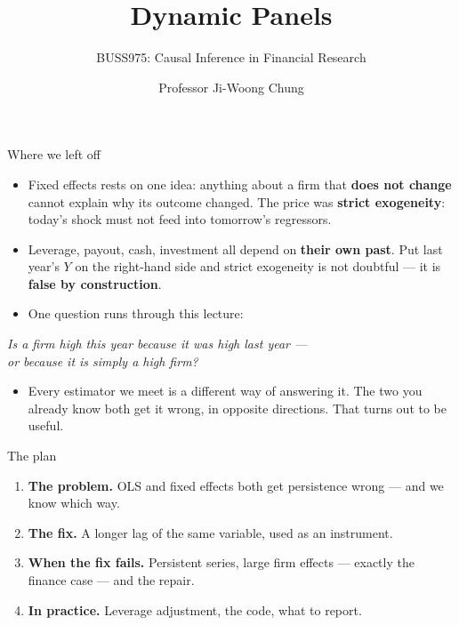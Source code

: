 \documentclass[
  11pt,
  ignorenonframetext,
  aspectratio=169,
]{beamer}
\title{\texorpdfstring{Dynamic Panels}{Dynamic Panels}}
\subtitle{\texorpdfstring{BUSS975: Causal Inference in Financial
Research}{BUSS975: Causal Inference in Financial Research}}
\author{Professor Ji-Woong Chung}
\date{}
\institute{Korea University}
\providecommand{\tightlist}{%
  \setlength{\itemsep}{0pt}\setlength{\parskip}{0pt}}
\begin{document}
\frame{\titlepage}


\begin{frame}{Where we left off}
\protect{}\label{where-we-left-off}
\begin{itemize}
\tightlist
\item
  Fixed effects rests on one idea: anything about a firm that
  \textbf{does not change} cannot explain why its outcome changed. The
  price was \textbf{strict exogeneity}: today's shock must not feed into
  tomorrow's regressors.
\item
  Leverage, payout, cash, investment all depend on \textbf{their own
  past}. Put last year's \(Y\) on the right-hand side and strict
  exogeneity is not doubtful --- it is \textbf{false by construction}.
\end{itemize}

\vspace{0.5em}

\begin{itemize}
\tightlist
\item
  One question runs through this lecture:
\end{itemize}

\begin{center}
\emph{Is a firm high this year because it was high last year ---\\ or because it is simply a high firm?}
\end{center}

\begin{itemize}
\tightlist
\item
  Every estimator we meet is a different way of answering it. The two
  you already know both get it wrong, in opposite directions. That turns
  out to be useful.
\end{itemize}
\end{frame}

\begin{frame}{The plan}
\protect{}\label{the-plan}
\begin{enumerate}
\tightlist
\item
  \textbf{The problem.} OLS and fixed effects both get persistence wrong
  --- and we know which way.
\item
  \textbf{The fix.} A longer lag of the same variable, used as an
  instrument.
\item
  \textbf{When the fix fails.} Persistent series, large firm effects ---
  exactly the finance case --- and the repair.
\item
  \textbf{In practice.} Leverage adjustment, the code, what to report.
\end{enumerate}
\end{frame}
\end{document}
